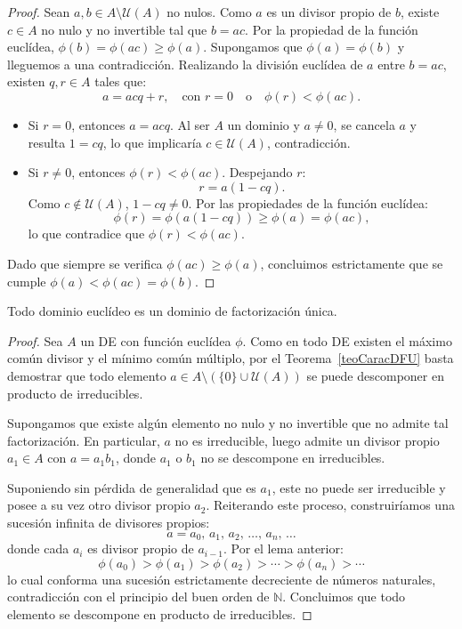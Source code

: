 \begin{proof}
    Sean $a, b \in A \setminus \mathcal{U}(A)$ no nulos. Como $a$ es un divisor propio de $b$, existe $c \in A$ no nulo y no invertible tal que $b = ac$. Por la propiedad de la función euclídea, $\phi(b) = \phi(ac) \geq \phi(a)$. Supongamos que $\phi(a) = \phi(b)$ y lleguemos a una contradicción. Realizando la división euclídea de $a$ entre $b=ac$, existen $q, r \in A$ tales que:
    \[
        a = acq + r, \quad \text{con } r = 0 \quad \text{o} \quad \phi(r) < \phi(ac).
    \]
    \begin{itemize}
        \item Si $r = 0$, entonces $a = acq$. Al ser $A$ un dominio y $a \neq 0$, se cancela $a$ y resulta $1 = cq$, lo que implicaría $c \in \mathcal{U}(A)$, contradicción.
        \item Si $r \neq 0$, entonces $\phi(r) < \phi(ac)$. Despejando $r$:
        \[
            r = a(1 - cq).
        \]
        Como $c \notin \mathcal{U}(A)$, $1 - cq \neq 0$. Por las propiedades de la función euclídea:
        \[
            \phi(r) = \phi(a(1 - cq)) \geq \phi(a) = \phi(ac),
        \]
        lo que contradice que $\phi(r) < \phi(ac)$.
    \end{itemize}
    Dado que siempre se verifica $\phi(ac) \geq \phi(a)$, concluimos estrictamente que se cumple $\phi(a) < \phi(ac)= \phi(b)$.
\end{proof}

\begin{teo}\label{teoDEEntoncesDFU}
    Todo dominio euclídeo es un dominio de factorización única.
\end{teo}

\begin{proof}
    Sea $A$ un DE con función euclídea $\phi$. Como en todo DE existen el máximo común divisor y el mínimo común múltiplo, por el Teorema~\ref{teoCaracDFU} basta demostrar que todo elemento $a \in A \setminus (\{0\} \cup \mathcal{U}(A))$ se puede descomponer en producto de irreducibles.

    Supongamos que existe algún elemento no nulo y no invertible que no admite tal factorización. En particular, $a$ no es irreducible, luego admite un divisor propio $a_1 \in A$ con $a = a_1 b_1$, donde $a_1$ o $b_1$ no se descompone en irreducibles.

    Suponiendo sin pérdida de generalidad que es $a_1$, este no puede ser irreducible y posee a su vez otro divisor propio $a_2$. Reiterando este proceso, construiríamos una sucesión infinita de divisores propios:
    \[
        a = a_0, \, a_1, \, a_2, \, \dots, \, a_n, \, \dots
    \]
    donde cada $a_i$ es divisor propio de $a_{i-1}$. Por el lema anterior:
    \[
        \phi(a_0) > \phi(a_1) > \phi(a_2) > \cdots > \phi(a_n) > \cdots
    \]
    lo cual conforma una sucesión estrictamente decreciente de números naturales, contradicción con el principio del buen orden de $\mathbb{N}$. Concluimos que todo elemento se descompone en producto de irreducibles.
\end{proof}

